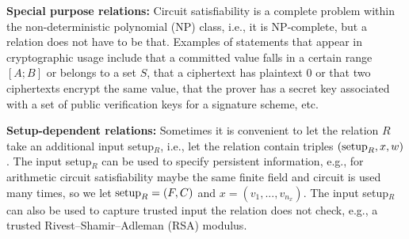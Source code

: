 \textbf{Special purpose relations:} Circuit satisfiability is 
a complete problem within the non-deterministic polynomial (NP) class,
i.e., it is NP-complete,
but a relation does not have to be that. 
	Examples of statements that appear in cryptographic usage include that a committed value falls in a certain range $[A;B]$ or belongs to a set $S$, that a ciphertext has plaintext 0 or that two ciphertexts encrypt the same value, that the prover has a secret key associated with a set of public verification keys for a signature scheme, etc.


\textbf{Setup-dependent relations:} 
Sometimes it is convenient to let the relation $R$ take an additional input setup$_R$, i.e., let the relation contain triples $(\textmd{setup}_R, x, w)$. 
	The input setup$_R$ can be used to specify persistent information, e.g., 
for arithmetic circuit satisfiability maybe the same finite field and circuit is used many times, 
so we let $\textmd{setup}_R = (F, C)$ and $x = (v_1,...,v_{n_x})$.
	The input setup$_R$ can also be used to capture trusted input the relation does not check, 
e.g., a trusted Rivest--Shamir--Adleman (RSA) modulus.

